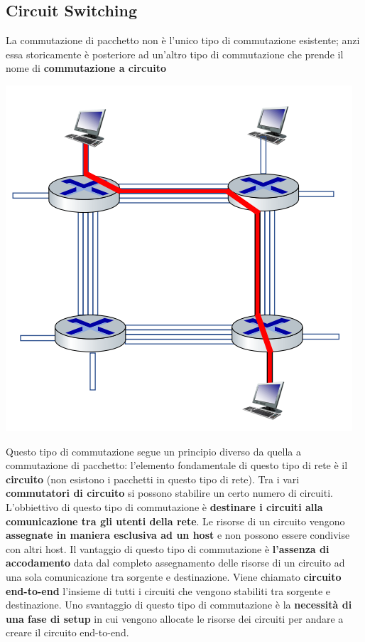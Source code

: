 \documentclass[12pt]{article}
\begin{document}
\subsection{Circuit Switching}
La commutazione di pacchetto non è l'unico tipo di commutazione esistente; anzi essa storicamente è posteriore ad un'altro tipo di commutazione
che prende il nome di \textbf{commutazione a circuito}
\begin{center}
    \includegraphics[width =0.45\linewidth]{Images/8.PNG}
\end{center}
Questo tipo di commutazione segue un principio diverso da quella a commutazione di pacchetto: l'elemento fondamentale di questo tipo di rete è il \textbf{circuito} (non esistono i pacchetti in questo tipo di rete).
Tra i vari \textbf{commutatori di circuito} si possono stabilire un certo numero di circuiti.
L'obbiettivo di questo tipo di commutazione è \textbf{destinare i circuiti alla comunicazione tra gli utenti della rete}.
Le risorse di un circuito vengono \textbf{assegnate in maniera esclusiva ad un host} e non possono essere condivise con altri host.
Il vantaggio di questo tipo di commutazione è \textbf{l'assenza di accodamento} data dal completo assegnamento delle risorse di un circuito
ad una sola comunicazione tra sorgente e destinazione.
Viene chiamato \textbf{circuito end-to-end} l'insieme di tutti i circuiti che vengono stabiliti tra sorgente e destinazione.
Uno svantaggio di questo tipo di commutazione è la \textbf{necessità di una fase di setup} in cui vengono allocate le risorse dei circuiti per andare a creare
il circuito end-to-end.
\end{document}
